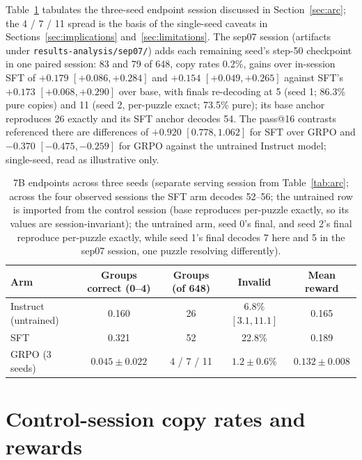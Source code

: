 \documentclass{article}
\begin{document}
Table~\ref{tab:endpoints} tabulates the three-seed endpoint session
discussed in Section~\ref{sec:arc}; the 4 / 7 / 11 spread is the basis of
the single-seed caveats in Sections~\ref{sec:implications}
and~\ref{sec:limitations}. The sep07 session (artifacts under \texttt{results-analysis/sep07/}) adds each remaining seed's step-50 checkpoint in one paired session: 83 and 79 of 648, copy rates 0.2\%, gains over in-session SFT of $+0.179$ $[+0.086, +0.284]$ and $+0.154$ $[+0.049, +0.265]$ against SFT's $+0.173$ $[+0.068, +0.290]$ over base, with finals re-decoding at 5 (seed 1; 86.3\% pure copies) and 11 (seed 2, per-puzzle exact; 73.5\% pure); its base anchor reproduces 26 exactly and its SFT anchor decodes 54. The pass@16 contrasts referenced there are
differences of $+0.920$ $[0.778, 1.062]$ for SFT over GRPO and $-0.370$
$[-0.475, -0.259]$ for GRPO against the untrained Instruct model;
single-seed, read as illustrative only.

\begin{table}[h]
\centering
\caption{7B endpoints across three seeds (separate serving session from Table~\ref{tab:arc}; across the four observed sessions the SFT arm decodes 52--56; the untrained row is imported from the control session (base reproduces per-puzzle exactly, so its values are session-invariant); the untrained arm, seed 0's final, and seed 2's final reproduce per-puzzle exactly, while seed 1's final decodes 7 here and 5 in the sep07 session, one puzzle resolving differently).}
\label{tab:endpoints}
\small
\setlength{\tabcolsep}{4pt}
\begin{tabular}{lcccc}
\toprule
Arm & Groups correct (0--4) & Groups (of 648) & Invalid & Mean reward \\
\midrule
Instruct (untrained) & 0.160 & 26 & 6.8\% $[3.1, 11.1]$ & 0.165 \\
SFT   & 0.321 & 52 & 22.8\% & 0.189 \\
GRPO (3 seeds) & $0.045 \pm 0.022$ & 4 / 7 / 11 & $1.2 \pm 0.6$\% & $0.132 \pm 0.008$ \\
\bottomrule
\end{tabular}
\end{table}

\section{Control-session copy rates and rewards}
\label{app:copy}
\end{document}
